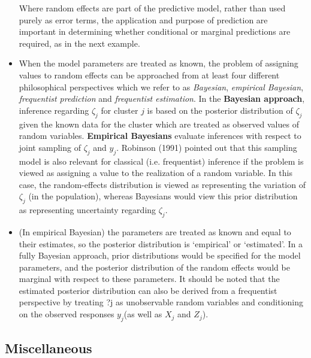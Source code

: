 \documentclass{article}
\begin{document}
\begin{itemize}
Where random effects are part of the predictive model, rather than used purely as error terms, the application and purpose of prediction are important in determining whether conditional or marginal predictions are required, as in the next example. 


\item \cite{skrondal2009prediction} When the model parameters are treated as known, the problem of assigning values to random effects can be approached from at least four different philosophical perspectives which we refer to as {\em Bayesian}, {\em empirical Bayesian}, {\em frequentist prediction} and {\em frequentist estimation}. In the {\bf Bayesian approach}, inference regarding $\zeta_j$ for cluster $j$ is based on the posterior distribution of $\zeta_j$ given the known data for the cluster which are treated as observed values of random variables. {\bf Empirical Bayesians} evaluate inferences with respect to joint sampling of $\zeta_j$  and $y_j$. Robinson (1991) pointed out that this sampling model is also relevant for classical (i.e. frequentist) inference if the problem is viewed as assigning a value to the realization of a random variable. In this case, the random-effects distribution is viewed as representing the variation of $\zeta_j$ (in the population), whereas Bayesians would view this prior distribution as representing uncertainty regarding $\zeta_j$. 

\item (In empirical Bayesian) the parameters are treated as known and equal to their estimates, so the posterior distribution is `empirical' or `estimated'. In a fully Bayesian approach, prior distributions would be specified for the model parameters, and the posterior distribution of the random effects would be marginal with respect to these parameters. It should be noted that the estimated posterior distribution can also be derived from a frequentist perspective by treating ?j as unobservable random variables and conditioning on the observed responses $y_j $(as well as $X_j$ and $Z_j$).

\end{itemize}




\subsection*{Miscellaneous}%
\end{document}
